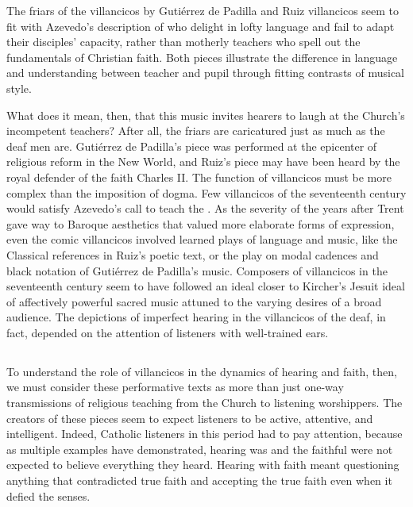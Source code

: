 The friars of the villancicos by Gutiérrez de Padilla and Ruiz villancicos seem
to fit with Azevedo's description of  who delight in
lofty language and fail to adapt their disciples' capacity, rather than motherly
teachers who spell out the fundamentals of Christian faith.
Both pieces illustrate the difference in language and understanding between
teacher and pupil through fitting contrasts of musical style.


What does it mean, then, that this music invites hearers to laugh at the
Church's incompetent teachers? 
After all, the friars are caricatured just as much as the deaf men are.
Gutiérrez de Padilla's piece was performed at the epicenter of religious reform
in the New World, and Ruiz's piece may have been heard by the royal defender of
the faith Charles II.  
The function of villancicos must be more complex than the imposition of dogma.
Few villancicos of the seventeenth century would satisfy Azevedo's call to teach
the .  
As the severity of the years after Trent gave way to Baroque aesthetics that
valued more elaborate forms of expression, even the comic villancicos involved
learned plays of language and music, like the Classical references in Ruiz's
poetic text, or the play on modal cadences and black notation of Gutiérrez de
Padilla's music.
Composers of villancicos in the seventeenth century seem to have followed an
ideal closer to Kircher's Jesuit ideal of affectively powerful sacred music
attuned to the varying desires of a broad audience.
The depictions of imperfect hearing in the villancicos of the deaf, in fact,
depended on the attention of listeners with well-trained ears.


\subsection{}

To understand the role of villancicos in the dynamics of hearing and faith,
then, we must consider these performative texts as more than just one-way
transmissions of religious teaching from the Church to listening worshippers.
The creators of these pieces seem to expect listeners to be active, attentive,
and intelligent.
Indeed, Catholic listeners in this period had to pay attention, because as
multiple examples have demonstrated, hearing was  and the faithful were not expected to believe everything they heard.
Hearing with faith meant questioning anything that contradicted true faith and
accepting the true faith even when it defied the senses.

